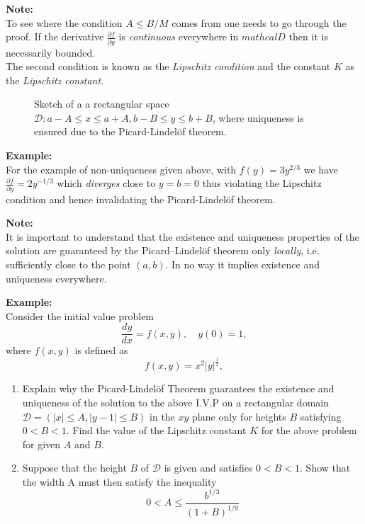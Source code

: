 \documentclass[11pt,a4paper,twoside]{report}
\begin{document}
	\textbf{Note:}\\
	To see where the condition $A \leq B/M$ comes from one needs to go through the proof. If the derivative $\frac{\partial f}{\partial y}$ is \textit{continuous} everywhere in $mathcal{D}$ then it is necessarily bounded.\\
	The second condition is known as the \textit{Lipschitz condition} and the constant $K$ as the \textit{Lipschitz constant}.
	\begin{figure}[H]
		\centering
		\caption{Sketch of a a rectangular space $\mathcal{D}:{a − A \leq x \leq a + A, b − B \leq y \leq b + B}$, where uniqueness is ensured due to the Picard-Lindel\"{o}f theorem.}
	\end{figure}
	\textbf{Example:}\\
	For the example of non-uniqueness given above, with $f(y)=3y^{2/3}$ we have $\frac{\partial f}{\partial y} = 2y^{-1/3}$ which \textit{diverges} close to $y=b=0$ thus violating the Lipschitz condition and hence invalidating the Picard-Lindel\"{o}f theorem.\par
	\textbf{Note:}\\
	It is important to understand that the existence and uniqueness properties of the solution are guaranteed by the Picard–Lindel\"{o}f theorem only \textit{locally}, i.e. sufficiently close to the point $(a, b)$. In no way it implies existence and uniqueness everywhere.\par
	\textbf{Example:}\\
	Consider the initial value problem
	$$
	\frac{dy}{dx} = f(x,y), \quad y(0) = 1,
	$$
	where $f(x, y)$ is defined as
	$$
	f(x,y) = x^2|y|^{\frac{1}{3}},
	$$
	\begin{enumerate}[\bfseries i)]
		\item Explain why the Picard-Lindel\"{o}f Theorem guarantees the existence and uniqueness of the solution to the above I.V.P on a rectangular domain $\mathcal{D} = (|x| \leq A, |y − 1| \leq B)$ in the $xy$ plane only for heights $B$ satisfying $0 < B < 1$. Find the value of the Lipschitz constant $K$ for the above problem for given $A$ and $B$.
		\item Suppose that the height $B$ of $\mathcal{D}$ is given and satisfies $0 < B < 1$. Show that the width A must then satisfy the inequality
		$$
		0 < A \leq \frac{b^{1/3}}{(1+B)^{1/9}}
		$$
	\end{enumerate}
\end{document}
